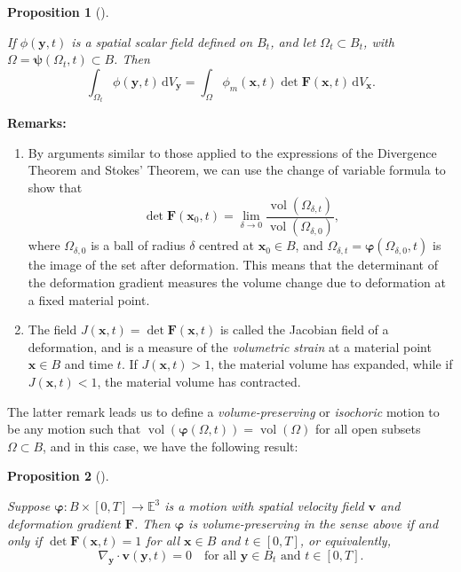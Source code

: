 \documentclass[
  letterpaper,
  DIV=11,
  numbers=noendperiod]{scrreprt}
\theoremstyle{plain}
\newtheorem{proposition}{Proposition}[chapter]
\theoremstyle{remark}
\begin{document}
\begin{proposition}[]\protect\hypertarget{prp-TransformationOfVolumeIntegrals}{}\label{prp-TransformationOfVolumeIntegrals}

If \(\phi({\boldsymbol{y}},t)\) is a spatial scalar field defined on
\(B_t\), and let \(\Omega_t\subset B_t\), with
\(\Omega = {\boldsymbol{\psi}}(\Omega_t,t)\subset B\). Then
\[\int_{\Omega_t}\phi({\boldsymbol{y}},t){\,{\mathrm{d}}V_{{\boldsymbol{y}}}}= \int_\Omega \phi_m({\boldsymbol{x}},t)\det{\boldsymbol{F}}({\boldsymbol{x}},t){\,{\mathrm{d}}V_{{\boldsymbol{x}}}}.\]

\end{proposition}

\textbf{Remarks:}

\begin{enumerate}
\def\labelenumi{\arabic{enumi}.}
\item
  By arguments similar to those applied to the expressions of the
  Divergence Theorem and Stokes' Theorem, we can use the change of
  variable formula to show that
  \[\det {\boldsymbol{F}}({\boldsymbol{x}}_0,t) = \lim_{\delta\to 0} \frac{{\operatorname{vol}}(\Omega_{\delta,t})}{{\operatorname{vol}}(\Omega_{\delta,0})},\]
  where \(\Omega_{\delta,0}\) is a ball of radius \(\delta\) centred at
  \({\boldsymbol{x}}_0\in B\), and
  \(\Omega_{\delta,t} = {\boldsymbol{\varphi}}(\Omega_{\delta,0},t)\) is
  the image of the set after deformation. This means that the
  determinant of the deformation gradient measures the volume change due
  to deformation at a fixed material point.
\item
  The field
  \(J({\boldsymbol{x}},t) = \det {\boldsymbol{F}}({\boldsymbol{x}},t)\)
  is called the Jacobian field of a deformation, and is a measure of the
  \emph{volumetric strain} at a material point \({\boldsymbol{x}}\in B\)
  and time \(t\). If \(J({\boldsymbol{x}},t)>1\), the material volume
  has expanded, while if \(J({\boldsymbol{x}},t)<1\), the material
  volume has contracted.
\end{enumerate}

The latter remark leads us to define a \emph{volume-preserving} or
\emph{isochoric} motion to be any motion such that
\({\operatorname{vol}}({\boldsymbol{\varphi}}(\Omega,t))={\operatorname{vol}}(\Omega)\)
for all open subsets \(\Omega\subset B\), and in this case, we have the
following result:

\begin{proposition}[]\protect\hypertarget{prp-volumepreserving}{}\label{prp-volumepreserving}

Suppose \({\boldsymbol{\varphi}}:B\times[0,T]\to{\mathbb{E}}^3\) is a
motion with spatial velocity field \({\boldsymbol{v}}\) and deformation
gradient \({\boldsymbol{F}}\). Then \({\boldsymbol{\varphi}}\) is
volume-preserving in the sense above if and only if
\(\det{\boldsymbol{F}}({\boldsymbol{x}},t) = 1\) for all
\({\boldsymbol{x}}\in B\) and \(t\in[0,T]\), or equivalently,
\[\nabla_{\boldsymbol{y}}\cdot{\boldsymbol{v}}({\boldsymbol{y}},t) = 0\quad\text{for all }{\boldsymbol{y}}\in B_t\text{ and }t\in[0,T].\]

\end{proposition}
\end{document}
